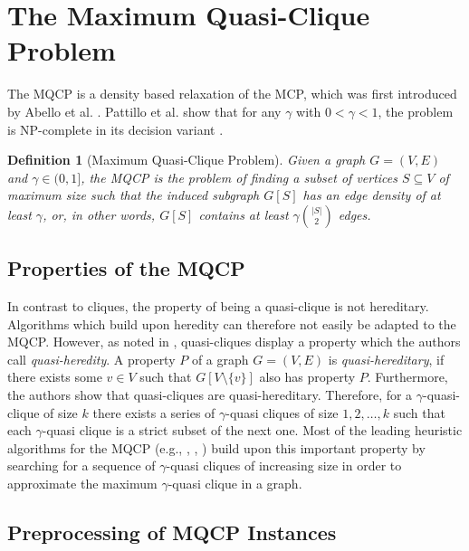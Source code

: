 \documentclass[draft,final]{vutinfth} %
\newtheorem{definition}{Definition}[section]
\begin{document}
\section{The Maximum Quasi-Clique Problem}\label{sec:mqcp}

The MQCP is a density based relaxation of the MCP, which was first introduced by Abello et al. \cite{Abello2002}. Pattillo et al. show that for any $\gamma$ with $0 < \gamma < 1$, the problem is NP-complete in its decision variant \cite{pattillo_maximum_2013}. 

\begin{definition}[Maximum Quasi-Clique Problem]
	\label{def:mqcp}
	Given a graph $G = (V,E)$ and $\gamma \in (0,1]$, the MQCP is the problem of finding a subset of vertices $S \subseteq V$ of maximum size 
	such that the induced subgraph $G[S]$ has an edge density of at least $\gamma$, or, in other words, $G[S]$ contains at least $\gamma \binom{|S|}{2}$ edges. 
\end{definition}

\subsection{Properties of the MQCP}
In contrast to cliques, the property of being a quasi-clique is not hereditary. Algorithms which build upon heredity can therefore not easily be adapted to the MQCP. However, as noted in \cite{pattillo_maximum_2013}, quasi-cliques display a property which the authors call \textit{quasi-heredity}. A property $P$ of a graph $G = (V, E)$ is \textit{quasi-hereditary}, if there exists some $v \in V$ such that $G[V \setminus \{v\}]$ also has property $P$. Furthermore, the authors show that quasi-cliques are quasi-hereditary. Therefore, for a $\gamma$-quasi-clique of size $k$ there exists a series of $\gamma$-quasi cliques of size $1,2, \dots, k$ such that each $\gamma$-quasi clique is a strict subset of the next one. Most of the leading heuristic algorithms for the MQCP (e.g., \cite{djeddi_extension_2019}, \cite{zhou_opposition-based_2020}, \cite{chen_nuqclq_2021}) build upon this important property by searching for a sequence of $\gamma$-quasi cliques of increasing size in order to approximate the maximum $\gamma$-quasi clique in a graph. 

\subsection{Preprocessing of MQCP Instances}
\end{document}
